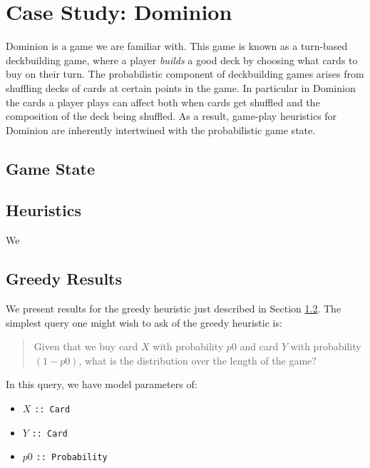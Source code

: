 
\section{Case Study: Dominion} \label{sec:dom}

Dominion is a game we are familiar with. This game is known as a turn-based
deckbuilding game, where a player \emph{builds} a good deck by choosing what
cards to buy on their turn. The probabilistic component of deckbuilding games
arises from shuffling decks of cards at certain points in the game. In particular
in Dominion the cards a player plays can affect both when cards get shuffled
and the composition of the deck being shuffled. As a result, game-play heuristics
for Dominion are inherently intertwined with the probabilistic game state.

\subsection{Game State}

\subsection{Heuristics} \label{sec:dom:heuristics}
We

\subsection{Greedy Results}
We present results for the greedy heuristic just described in
Section \ref{sec:dom:heuristics}. The simplest query one might wish to ask of
the greedy heuristic is:

\begin{quote} \label{quote:dominion-query}
Given that we buy card $X$ with probability $p0$ and card $Y$ with
probability $(1 - p0)$, what is the distribution over the length of
the game?
\end{quote}

In this query, we have model parameters of:

\begin{itemize}
\item $X$  \texttt{:: Card}
\item $Y$  \texttt{:: Card}
\item $p0$ \texttt{:: Probability}
\end{itemize}

